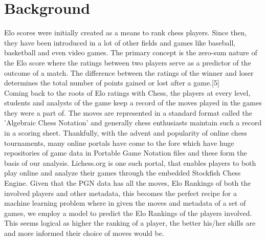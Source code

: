 \documentclass[11pt,a4paper]{article}
\begin{document}
\section{Background}
Elo scores were initially created as a means to rank chess players. Since then, they have been
introduced in a lot of other fields and games like baseball, basketball and even video games. The primary concept is the zero-sum nature of the Elo score where the ratings between two players
serve as a predictor of the outcome of a match. The difference between the ratings of the winner and loser determines the total number of points gained or lost after a game.[5] 
\\Coming back to the roots of Elo ratings with Chess, the players at every level, students and analysts of the game keep a record of the moves played in the games they were a part of. The moves are represented in a standard format called the 'Algebraic Chess Notation' and generally chess enthusiasts maintain such a record in a scoring sheet. Thankfully, with the advent and popularity of online chess tournaments, many online portals have come to the fore which have huge repositories of game data in Portable Game Notation files \cite{PGN} and these form the basis of our analysis. Lichess.org\cite{Lichess} is one such portal,  that enables players to both play online and analyze their games through the embedded Stockfish Chess Engine\cite{Stockfish}. Given that the PGN data has all the moves, Elo Rankings of both the involved players and other metadata, this becomes the perfect recipe for a machine learning problem where in given the moves and metadata of a set of games, we employ a model to predict the Elo Rankings of the players involved. This seems logical as higher the ranking of a player, the better his/her skills are and more informed their choice of moves would be.
\end{document}
